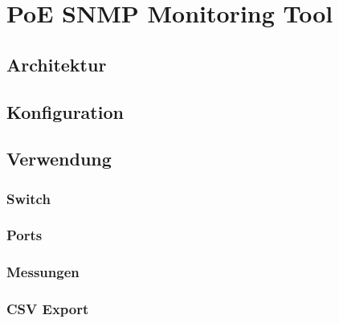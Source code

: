 \section{PoE SNMP Monitoring Tool}
\label{sec:tool}

\subsection{Architektur}

\subsection{Konfiguration}

\subsection{Verwendung}

\subsubsection{Switch}

\subsubsection{Ports}

\subsubsection{Messungen}

\subsubsection{CSV Export}
